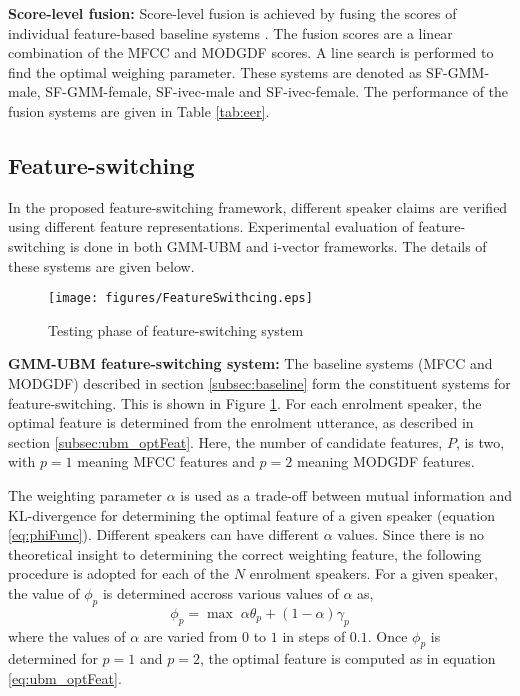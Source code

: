 \documentclass{article}
\begin{document}
\textbf{Score-level fusion:}  Score-level fusion is achieved by
fusing the scores of individual feature-based baseline systems
\cite{fusion}. The fusion scores are a linear combination of
the MFCC and MODGDF scores. A line search is performed to find
the optimal weighing parameter. These systems are denoted as
SF-GMM-male, SF-GMM-female, SF-ivec-male and SF-ivec-female.
The performance of the fusion systems are given in Table
\ref{tab:eer}. 

	
\subsection{Feature-switching}
\label{subsec:featSwitch}

In the proposed feature-switching framework, different speaker
claims are verified using different feature representations. 
Experimental evaluation of feature-switching is done in both
GMM-UBM and i-vector frameworks. The details of these systems
are given below.

\begin{figure}[h]
\texttt{[image: figures/FeatureSwithcing.eps]}
\caption{Testing phase of feature-switching system}
\label{fig:systemArch2}
\end{figure}


\textbf{GMM-UBM feature-switching system:}
The baseline systems (MFCC and MODGDF) described in section \ref{subsec:baseline} form the
constituent systems for feature-switching. This is shown in Figure \ref{fig:systemArch2}. For each enrolment
speaker, the optimal feature is determined from the enrolment utterance, as described in section
\ref{subsec:ubm_optFeat}. Here, the number of candidate features, $P$, is two,
with $p=1$ meaning MFCC features and $p=2$ meaning MODGDF features.

The weighting parameter $\alpha$ is used as a trade-off between mutual information and
KL-divergence for determining the optimal feature of a given speaker (equation
\ref{eq:phiFunc}). Different speakers can have different $\alpha$ values. Since
there is no theoretical insight to determining the correct weighting feature,
the following procedure is adopted for each of the $N$ enrolment speakers.
For a given speaker, the value of $\phi_p$ is determined accross various values
of $\alpha$ as, 
\begin{equation}
\phi_p = \max \; \alpha \theta_p + (1-\alpha) \gamma_p
\end{equation}
where the values of $\alpha$ are varied from $0$ to $1$ in steps of $0.1$. Once
$\phi_p$ is determined for $p=1$ and $p=2$, the optimal feature is computed as in equation
\ref{eq:ubm_optFeat}.
\end{document}

